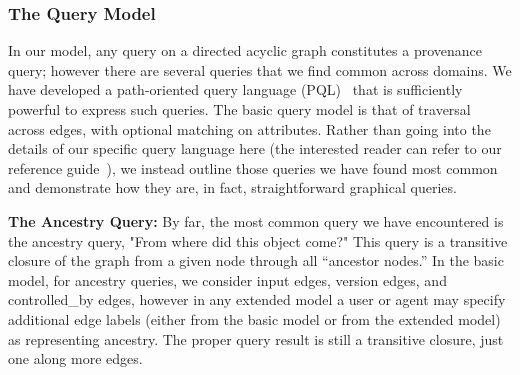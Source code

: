 \documentclass[10pt]{article}
\begin{document}

\subsubsection{The Query Model}

In our model, any query on a directed acyclic graph constitutes a
provenance query; however there are several queries that we find
common across domains.
We have developed a path-oriented query language (PQL)~\cite{pql-manual} that is
sufficiently powerful to express such queries.
The basic query model is that of traversal across edges, with optional
matching on attributes.
Rather than going into the details of our specific query language here
(the interested reader can refer to our reference guide~\cite{pql-manual}),
we instead outline those queries we have found most common and demonstrate
how they are, in fact, straightforward graphical queries.

\textbf{The Ancestry Query: }
By far, the most common query we have encountered is the ancestry
query, "From where did this object come?" This query is a transitive
closure of the graph from a given node through all ``ancestor nodes.''
In the basic model, for ancestry queries, we consider input edges,
version edges, and controlled\_by edges, however in any extended
model a user or agent may specify additional edge labels (either from
the basic model or from the extended model) as representing ancestry.
The proper query result is still a transitive closure, just one along
more edges.

\end{document}
